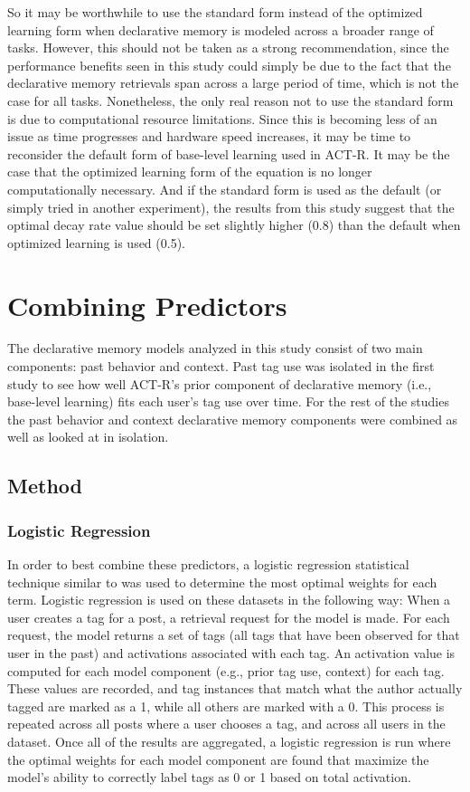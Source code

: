 \documentclass[man,floatsintext,donotrepeattitle]{apa6}
\begin{document}
So it may be worthwhile to use the standard form instead of the optimized learning form when declarative memory is modeled across a broader range of tasks.
However, this should not be taken as a strong recommendation,
since the performance benefits seen in this study could simply be due to the fact that the declarative memory retrievals span across a large period of time, which is not the case for all tasks.
Nonetheless, the only real reason not to use the standard form is due to computational resource limitations.
Since this is becoming less of an issue as time progresses and hardware speed increases, it may be time to reconsider the default form of base-level learning used in ACT-R.
It may be the case that the optimized learning form of the equation is no longer computationally necessary.
And if the standard form is used as the default (or simply tried in another experiment),
the results from this study suggest that the optimal decay rate value should be set slightly higher (\num{0.8}) than the default when optimized learning is used (\num{0.5}).

\section{Combining Predictors}

The declarative memory models analyzed in this study consist of two main components: past behavior and context.
Past tag use was isolated in the first study to see how well ACT-R's prior component of declarative memory (i.e., base-level learning) fits each user's tag use over time.
For the rest of the studies the past behavior and context declarative memory components were combined as well as looked at in isolation.

\subsection{Method}

\subsubsection{Logistic Regression}

In order to best combine these predictors, a logistic regression statistical technique similar to \textcite{Stanley2013} was used to determine the most optimal weights for each term.
Logistic regression is used on these datasets in the following way:
When a user creates a tag for a post, a retrieval request for the model is made.
For each request, the model returns a set of tags (all tags that have been observed for that user in the past) and activations associated with each tag.
An activation value is computed for each model component (e.g., prior tag use, context) for each tag.
These values are recorded, and tag instances that match what the author actually tagged are marked as a 1, while all others are marked with a 0.
This process is repeated across all posts where a user chooses a tag, and across all users in the dataset.
Once all of the results are aggregated, a logistic regression is run where the optimal weights for each model component are found that maximize the model's ability to correctly label tags as 0 or 1 based on total activation.
\end{document}
